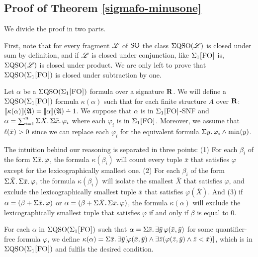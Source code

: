 \subsection*{Proof of Theorem \ref{sigmafo-minusone}}

We divide the proof in two parts.

\vspace{1em}
First, note that for every fragment $\mathscr{L}$ of ${\rm SO}$ the class $\Sigma{\rm QSO}(\mathscr{L})$ is closed under sum by definition, and if $\mathscr{L}$ is closed under conjunction, like $\Sigma_{1}\textsc{[FO]}$ is, $\Sigma{\rm QSO}(\mathscr{L})$ is closed under product. We are only left to prove that $\Sigma{\rm QSO}(\Sigma_{1}\textsc{[FO]})$ is closed under subtraction by one.

Let $\alpha$ be a $\Sigma{\rm QSO}(\Sigma_{1}\textsc{[FO]})$ formula over a signature $\mathbf{R}$. We will define a $\Sigma{\rm QSO}(\Sigma_{1}\textsc{[FO]})$ formula $\kappa(\alpha)$ such that for each finite structure $A$ over $\mathbf{R}$: $\sem{\kappa(\alpha)}(\A) = \sem{\alpha}(\A) \dotminus 1$. We suppose that $\alpha$ is in $\Sigma_{1}\textsc{[FO]}$-SNF and $\alpha = \sum_{i = 1}^{n}\Sigma{\bar{X}}.\,\Sigma{\bar{x}}.\,\varphi_i$ where each $\varphi_i$ is in $\Sigma_{1}\textsc{[FO]}$. Moreover, we assume that $\ell(\bar{x}) > 0$ since we can replace each $\varphi_i$ for the equivalent formula $\Sigma{y}.\,\varphi_i\wedge\min(y)$.

The intuition behind our reasoning is separated in three points: (1) For each $\beta_i$ of the form $\Sigma{\bar{x}}.\,\varphi$, the formula $\kappa(\beta_i)$ will count every tuple $\bar{x}$ that satisfies $\varphi$ except for the lexicographically smallest one. (2) For each $\beta_i$ of the form $\Sigma{\bar{X}}.\,\Sigma{\bar{x}}.\,\varphi$, the formula $\kappa(\beta_i)$ will isolate the smallest $\bar{X}$ that satisfies $\varphi$, and exclude the lexicographically smallest tuple $\bar{x}$ that satisfies $\varphi(\bar{X})$. And (3) if $\alpha = (\beta+\Sigma{\bar{x}}.\,\varphi)$ or $\alpha = (\beta+\Sigma{\bar{X}}.\,\Sigma{\bar{x}}.\,\varphi)$, the formula $\kappa(\alpha)$ will exclude the lexicographically smallest tuple that satisfies $\varphi$ if and only if $\beta$ is equal to 0.

\vspace{1em}

For each $\alpha$ in $\Sigma{\rm QSO}(\Sigma_{1}\textsc{[FO]})$ such that $\alpha = \Sigma{\bar{x}}.\,\exists\bar{y}\,\varphi(\bar{x},\bar{y})$ for some quantifier-free formula $\varphi$, we define $\kappa(\alpha) = \Sigma{\bar{x}}.\,\exists\bar{y}[\varphi(\bar{x},\bar{y})\wedge\exists\bar{z}(\varphi(\bar{z},\bar{y})\wedge\bar{z} < \bar{x})]$, which is in $\Sigma{\rm QSO}(\Sigma_{1}\textsc{[FO]})$ and fulfils the desired condition.

